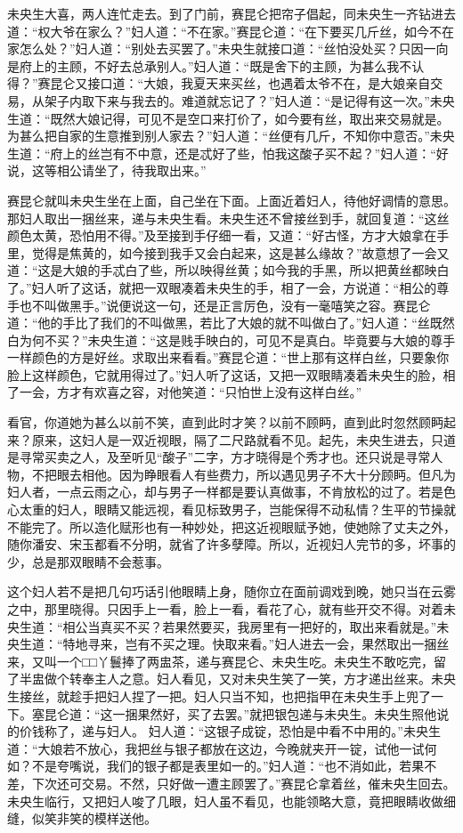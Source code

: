 \documentclass[a4paper,12pt,UTF8,twoside]{ctexbook}
\begin{document}
未央生大喜，两人连忙走去。到了门前，赛昆仑把帘子倡起，同未央生一齐钻进去道：“权大爷在家么？”妇人道：“不在家。”赛昆仑道：“在下要买几斤丝，如今不在家怎么处？”妇人道：“别处去买罢了。”未央生就接口道：“丝怕没处买？只因一向是府上的主顾，不好去总承别人。”妇人道：“既是舍下的主顾，为甚么我不认得？”赛昆仑又接口道：“大娘，我夏天来买丝，也遇着太爷不在，是大娘亲自交易，从架子内取下来与我去的。难道就忘记了？”妇人道：“是记得有这一次。”未央生道：“既然大娘记得，可见不是空口来打价了，如今要有丝，取出来交易就是。为甚么把自家的生意推到别人家去？”妇人道：“丝便有几斤，不知你中意否。”未央生道：“府上的丝岂有不中意，还是忒好了些，怕我这酸子买不起？”妇人道：“好说，这等相公请坐了，待我取出来。”

赛昆仑就叫未央生坐在上面，自己坐在下面。上面近着妇人，待他好调情的意思。那妇人取出一捆丝来，递与未央生看。未央生还不曾接丝到手，就回复道：“这丝颜色太黄，恐怕用不得。”及至接到手仔细一看，又道：“好古怪，方才大娘拿在手里，觉得是焦黄的，如今接到我手又会白起来，这是甚么缘故？”故意想了一会又道：“这是大娘的手忒白了些，所以映得丝黄；如今我的手黑，所以把黄丝都映白了。”妇人听了这话，就把一双眼凑着未央生的手，相了一会，方说道：“相公的尊手也不叫做黑手。”说便说这一句，还是正言厉色，没有一毫嘻笑之容。赛昆仑道：“他的手比了我们的不叫做黑，若比了大娘的就不叫做白了。”妇人道：“丝既然白为何不买？”未央生道：“这是贱手映白的，可见不是真白。毕竟要与大娘的尊手一样颜色的方是好丝。求取出来看看。”赛昆仑道：“世上那有这样白丝，只要象你脸上这样颜色，它就用得过了。”妇人听了这话，又把一双眼睛凑着未央生的脸，相了一会，方才有欢喜之容，对他笑道：“只怕世上没有这样白丝。”

看官，你道她为甚么以前不笑，直到此时才笑？以前不顾眄，直到此时忽然顾眄起来？原来，这妇人是一双近视眼，隔了二尺路就看不见。起先，未央生进去，只道是寻常买卖之人，及至听见“酸子”二字，方才晓得是个秀才也。还只说是寻常人物，不把眼去相他。因为睁眼看人有些费力，所以遇见男子不大十分顾眄。但凡为妇人者，一点云雨之心，却与男子一样都是要认真做事，不肯放松的过了。若是色心太重的妇人，眼睛又能远视，看见标致男子，岂能保得不动私情？生平的节操就不能完了。所以造化赋形也有一种妙处，把这近视眼赋予她，使她除了丈夫之外，随你潘安、宋玉都看不分明，就省了许多孽障。所以，近视妇人完节的多，坏事的少，总是那双眼睛不会惹事。

这个妇人若不是把几句巧话引他眼睛上身，随你立在面前调戏到晚，她只当在云雾之中，那里晓得。只因手上一看，脸上一看，看花了心，就有些开交不得。对着未央生道：“相公当真买不买？若果然要买，我房里有一把好的，取出来看就是。”未央生道：“特地寻来，岂有不买之理。快取来看。”妇人进去一会，果然取出一捆丝来，又叫一个□□丫鬟捧了两盅茶，递与赛昆仑、未央生吃。未央生不敢吃完，留了半盅做个转奉主人之意。妇人看见，又对未央生笑了一笑，方才递出丝来。未央生接丝，就趁手把妇人捏了一把。妇人只当不知，也把指甲在未央生手上兜了一下。塞昆仑道：“这一捆果然好，买了去罢。”就把银包递与未央生。未央生照他说的价钱称了，递与妇人。 妇人道：“这银子成锭，恐怕是中看不中用的。”未央生道：“大娘若不放心，我把丝与银子都放在这边，今晚就夹开一锭，试他一试何如？不是夸嘴说，我们的银子都是表里如一的。”妇人道：“也不消如此，若果不差，下次还可交易。不然，只好做一遭主顾罢了。”赛昆仑拿着丝，催未央生回去。未央生临行，又把妇人唆了几眼，妇人虽不看见，也能领略大意，竟把眼睛收做细缝，似笑非笑的模样送他。
\end{document}
